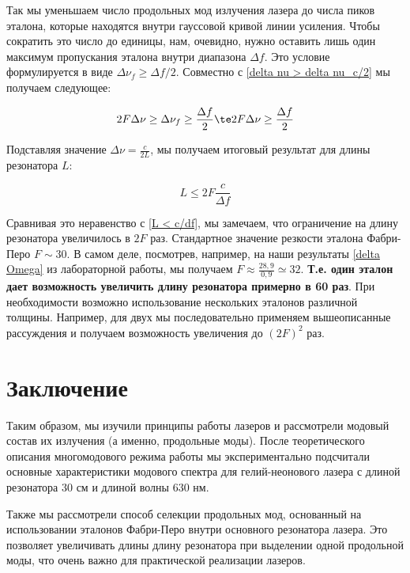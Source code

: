 \documentclass[12pt]{kiarticle}
\begin{document}
Так мы уменьшаем число продольных мод излучения лазера до числа пиков эталона, которые находятся внутри гауссовой кривой линии усиления. Чтобы сократить это число до единицы, нам, очевидно, нужно оставить лишь один максимум пропускания эталона внутри диапазона $ \Delta f $. Это условие формулируется в виде $ \Delta \nu_f \geq \Delta f /2$. Совместно с \eqref{delta nu > delta nu_c/2}  мы получаем следующее:

\begin{equation}\label{}
2 F \Delta \nu \geq \Delta \nu_f \geq \dfrac{\Delta f}{2} \te 2 F \Delta \nu \geq \dfrac{\Delta f}{2}
\end{equation}

Подставляя значение $ \Delta \nu = \frac{c}{2L} $, мы получаем итоговый результат для длины резонатора $ L $:

\begin{equation}\label{}
L \leq 2F \dfrac{c}{\Delta f}
\end{equation}

Сравнивая это неравенство с \eqref{L < c/df}, мы замечаем, что ограничение на длину резонатора увеличилось в $ 2F $ раз. Стандартное значение резкости эталона Фабри-Перо $ F \sim 30 $. В самом деле, посмотрев, например, на наши результаты \eqref{delta Omega} из лабораторной работы, мы получаем $ F \approx \frac{28,9}{0,9} \simeq 32 $. \textbf{Т.е. один эталон дает возможность увеличить длину резонатора примерно в 60 раз}. При необходимости возможно использование нескольких эталонов различной толщины. Например, для двух мы последовательно применяем вышеописанные рассуждения и получаем возможность увеличения до $ (2F)^2 $ раз. 

\section{Заключение}

Таким образом, мы изучили принципы работы лазеров и рассмотрели модовый состав их излучения (а именно, продольные моды). После теоретического описания многомодового режима работы мы экспериментально подсчитали основные характеристики модового спектра для гелий-неонового лазера с длиной резонатора 30 см и длиной волны 630 нм. 

Также мы рассмотрели способ селекции продольных мод, основанный на использовании эталонов Фабри-Перо внутри основного резонатора лазера. Это позволяет увеличивать длины длину резонатора при выделении одной продольной моды, что очень важно для практической реализации лазеров. 
\end{document}
